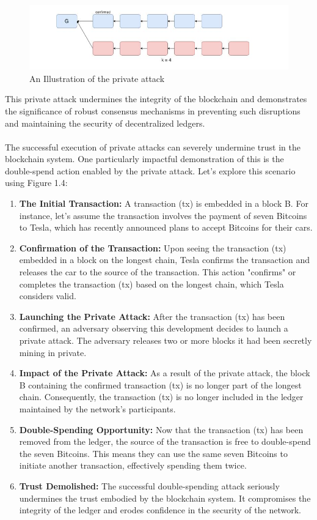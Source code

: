 \begin{center}
	\begin{figure}[h!]
		\centering
		\includegraphics[width=0.6\linewidth]{Fig/3/F3}
		\caption{An Illustration of the private attack}
		\label{fig:f1}
	\end{figure}
\end{center}
This private attack undermines the integrity of the blockchain and demonstrates the significance of robust consensus mechanisms in preventing such disruptions and maintaining the security of decentralized ledgers.\\\\
The successful execution of private attacks can severely undermine trust in the blockchain system. One particularly impactful demonstration of this is the double-spend action enabled by the private attack. Let's explore this scenario using Figure 1.4:
\begin{enumerate}
	\item \textbf{The Initial Transaction:} A transaction (tx) is embedded in a block B. For instance, let's assume the transaction involves the payment of seven Bitcoins to Tesla, which has recently announced plans to accept Bitcoins for their cars.
	\item \textbf{Confirmation of the Transaction:} Upon seeing the transaction (tx) embedded in a block on the longest chain, Tesla confirms the transaction and releases the car to the source of the transaction. This action "confirms" or completes the transaction (tx) based on the longest chain, which Tesla considers valid.
	\item \textbf{Launching the Private Attack:} After the transaction (tx) has been confirmed, an adversary observing this development decides to launch a private attack. The adversary releases two or more blocks it had been secretly mining in private.
	\item \textbf{Impact of the Private Attack:} As a result of the private attack, the block B containing the confirmed transaction (tx) is no longer part of the longest chain. Consequently, the transaction (tx) is no longer included in the ledger maintained by the network's participants.
	\item \textbf{Double-Spending Opportunity:} Now that the transaction (tx) has been removed from the ledger, the source of the transaction is free to double-spend the seven Bitcoins. This means they can use the same seven Bitcoins to initiate another transaction, effectively spending them twice.
	\item \textbf{Trust Demolished:} The successful double-spending attack seriously undermines the trust embodied by the blockchain system. It compromises the integrity of the ledger and erodes confidence in the security of the network.
\end{enumerate}
